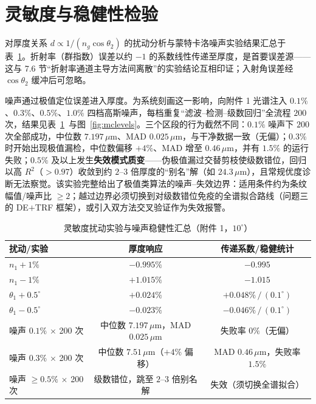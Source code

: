 \documentclass[11pt,a4paper,fontset=fandol]{ctexart}
\newcommand{\um}{\,\mu\mathrm{m}}
\begin{document}
\section{灵敏度与稳健性检验}\label{sec:sens}

对厚度关系 $d\propto 1/(n_g\cos\theta_2)$ 的扰动分析与蒙特卡洛噪声实验结果汇总于表~\ref{tab:sens}。折射率（群指数）误差以约 $-1$ 的系数线性传递至厚度，是首要误差源——这与 7.6 节``折射率通道主导方法间离散''的实验结论互相印证；入射角误差经 $\cos\theta_2$ 缓冲后可忽略。

噪声通过极值定位误差进入厚度。为系统刻画这一影响，向附件 1 光谱注入 $0.1\%$、$0.3\%$、$0.5\%$、$1.0\%$ 四档高斯噪声，每档重复``滤波--检测--级数回归''全流程 $200$ 次，结果见表~\ref{tab:sens}~与图~\ref{fig:mclevels}。三个区段的行为截然不同：$0.1\%$ 噪声下 $200$ 次全部成功，中位数 $7.197\um$、MAD $0.025\um$，与干净数据一致（无偏）；$0.3\%$ 时开始出现极值漏检，中位数偏移 $+4\%$、MAD 增至 $0.46\um$，并有 $1.5\%$ 的运行失败；$0.5\%$ 及以上发生\textbf{失效模式质变}——伪极值漏过交替剪枝使级数错位，回归以高 $R^2$（$>0.97$）收敛到约 $2$--$3$ 倍厚度的``别名''解（如 $24.3\um$），且常规优度诊断无法察觉。该实验完整给出了极值类算法的噪声--失效边界：适用条件约为条纹幅值/噪声比 $\ge2$；越过边界必须切换到对级数错位免疫的全谱拟合路线（问题三的 DE$+$TRF 框架），或引入双方法交叉验证作为失效报警。

\begin{table}[htbp]
    \centering
    \caption{灵敏度扰动实验与噪声稳健性汇总（附件 1，$10^\circ$）}
    \label{tab:sens}
    \small
    \begin{tabular}{lcc}
        \toprule
        扰动/实验 & 厚度响应 & 传递系数/稳健统计 \\
        \midrule
        $n_1+1\%$ & $-0.995\%$ & $-0.995$ \\
        $n_1-1\%$ & $+1.015\%$ & $-1.015$ \\
        $\theta_1+0.5^\circ$ & $+0.024\%$ & $+0.048\%\,/\,(0.1^\circ)$ \\
        $\theta_1-0.5^\circ$ & $-0.023\%$ & $-0.046\%\,/\,(0.1^\circ)$ \\
        噪声 $0.1\%$ $\times$ 200 次 & 中位数 $7.197\um$，MAD $0.025\um$ & 失败率 $0\%$（无偏） \\
        噪声 $0.3\%$ $\times$ 200 次 & 中位数 $7.51\um$（$+4\%$ 偏移） & MAD $0.46\um$，失败率 $1.5\%$ \\
        噪声 $\ge0.5\%$ $\times$ 200 次 & 级数错位，跳至 $2$--$3$ 倍别名解 & 失效（须切换全谱拟合） \\
        \bottomrule
    \end{tabular}
\end{table}
\end{document}
